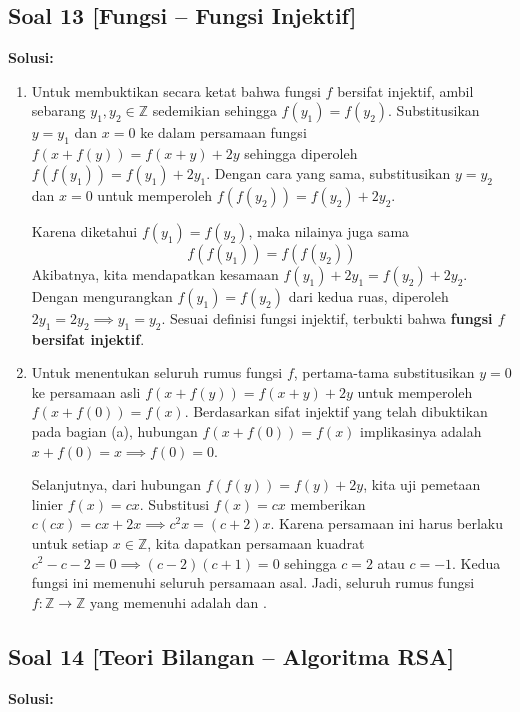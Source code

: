 \documentclass[12pt,a4paper]{article}
\begin{document}
\subsection*{Soal 13 [Fungsi -- Fungsi Injektif]}
\textbf{Solusi:}

\begin{enumerate}[label=(\alph*)]
    \item Untuk membuktikan secara ketat bahwa fungsi $f$ bersifat injektif, ambil sebarang $y_1, y_2 \in \mathbb{Z}$ sedemikian sehingga $f(y_1) = f(y_2)$. Substitusikan $y = y_1$ dan $x = 0$ ke dalam persamaan fungsi $f(x + f(y)) = f(x + y) + 2y$ sehingga diperoleh $f(f(y_1)) = f(y_1) + 2y_1$. Dengan cara yang sama, substitusikan $y = y_2$ dan $x = 0$ untuk memperoleh $f(f(y_2)) = f(y_2) + 2y_2$. 
    
    Karena diketahui $f(y_1) = f(y_2)$, maka nilainya juga sama
    \[ f(f(y_1)) = f(f(y_2)) \]
    Akibatnya, kita mendapatkan kesamaan $f(y_1) + 2y_1 = f(y_2) + 2y_2$. Dengan mengurangkan $f(y_1) = f(y_2)$ dari kedua ruas, diperoleh $2y_1 = 2y_2 \implies y_1 = y_2$. Sesuai definisi fungsi injektif, terbukti bahwa \textbf{fungsi $f$ bersifat injektif}.

    \item Untuk menentukan seluruh rumus fungsi $f$, pertama-tama substitusikan $y = 0$ ke persamaan asli $f(x + f(y)) = f(x + y) + 2y$ untuk memperoleh $f(x + f(0)) = f(x)$. Berdasarkan sifat injektif yang telah dibuktikan pada bagian (a), hubungan $f(x + f(0)) = f(x)$ implikasinya adalah $x + f(0) = x \implies f(0) = 0$. 
    
    Selanjutnya, dari hubungan $f(f(y)) = f(y) + 2y$, kita uji pemetaan linier $f(x) = cx$. Substitusi $f(x) = cx$ memberikan $c(cx) = cx + 2x \implies c^2 x = (c + 2)x$. Karena persamaan ini harus berlaku untuk setiap $x \in \mathbb{Z}$, kita dapatkan persamaan kuadrat $c^2 - c - 2 = 0 \implies (c - 2)(c + 1) = 0$ sehingga $c = 2$ atau $c = -1$. Kedua fungsi ini memenuhi seluruh persamaan asal. Jadi, seluruh rumus fungsi $f: \mathbb{Z} \to \mathbb{Z}$ yang memenuhi adalah  dan .
\end{enumerate}

\newpage
\subsection*{Soal 14 [Teori Bilangan -- Algoritma RSA]}
\textbf{Solusi:}
\end{document}
